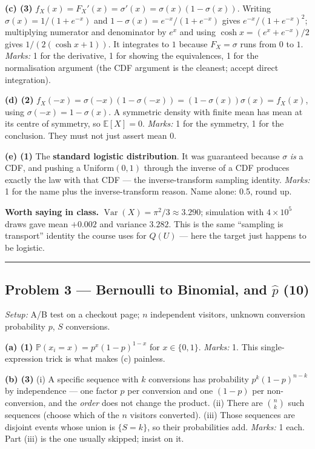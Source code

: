 \documentclass[
  11pt,
  a4paper,
]{article}
\newcommand{\PP}{\mathbb{P}}
\newcommand{\EE}{\mathbb{E}}
\newcommand{\Var}{\operatorname{Var}}
\newcommand{\sig}{\sigma}
\begin{document}
\textbf{(c) (3)} \(f_X(x) = F_X'(x) = \sig'(x) = \sig(x)(1-\sig(x))\).
Writing \(\sig(x) = 1/(1+e^{-x})\) and \(1-\sig(x) = e^{-x}/(1+e^{-x})\)
gives \(e^{-x}/(1+e^{-x})^2\); multiplying numerator and denominator by
\(e^{x}\) and using \(\cosh x = (e^x + e^{-x})/2\) gives
\(1/(2(\cosh x + 1))\). It integrates to \(1\) because \(F_X = \sig\)
runs from \(0\) to \(1\). \emph{Marks:} 1 for the derivative, 1 for
showing the equivalences, 1 for the normalisation argument (the CDF
argument is the cleanest; accept direct integration).

\textbf{(d) (2)}
\(f_X(-x) = \sig(-x)(1-\sig(-x)) = (1-\sig(x))\sig(x) = f_X(x)\), using
\(\sig(-x) = 1 - \sig(x)\). A symmetric density with finite mean has
mean at its centre of symmetry, so \(\EE[X] = 0\). \emph{Marks:} 1 for
the symmetry, 1 for the conclusion. They must not just assert mean
\(0\).

\textbf{(e) (1)} The \textbf{standard logistic distribution}. It was
guaranteed because \(\sig\) \emph{is} a CDF, and pushing a
\(\mathrm{Uniform}(0,1)\) through the inverse of a CDF produces exactly
the law with that CDF --- the inverse-transform sampling identity.
\emph{Marks:} 1 for the name plus the inverse-transform reason. Name
alone: 0.5, round up.

\textbf{Worth saying in class.} \(\Var(X) = \pi^2/3 \approx 3.290\);
simulation with \(4\times10^5\) draws gave mean \(+0.002\) and variance
\(3.282\). This is the same ``sampling is transport'' identity the
course uses for \(Q(U)\) --- here the target just happens to be
logistic.

\begin{center}\rule{0.5\linewidth}{0.5pt}\end{center}

\subsection{\texorpdfstring{Problem 3 --- Bernoulli to Binomial, and
\(\hat p\)
(10)}{Problem 3 --- Bernoulli to Binomial, and \textbackslash hat p (10)}}\label{problem-3-bernoulli-to-binomial-and-hat-p-10}

\emph{Setup:} A/B test on a checkout page; \(n\) independent visitors,
unknown conversion probability \(p\), \(S\) conversions.

\textbf{(a) (1)} \(\PP(x_i = x) = p^{x}(1-p)^{1-x}\) for
\(x \in \{0,1\}\). \emph{Marks:} 1. This single-expression trick is what
makes (c) painless.

\textbf{(b) (3)} (i) A specific sequence with \(k\) conversions has
probability \(p^{k}(1-p)^{n-k}\) by independence --- one factor \(p\)
per conversion and one \((1-p)\) per non-conversion, and the
\emph{order} does not change the product. (ii) There are
\(\binom{n}{k}\) such sequences (choose which of the \(n\) visitors
converted). (iii) Those sequences are disjoint events whose union is
\(\{S = k\}\), so their probabilities add. \emph{Marks:} 1 each. Part
(iii) is the one usually skipped; insist on it.
\end{document}
